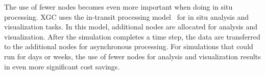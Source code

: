 The use of fewer nodes becomes even more important when doing in situ processing. XGC uses the in-transit processing model~\cite{ChildsTerminology, Choi2018} for in situ analysis and visualization tasks. In this model, additional nodes are allocated for analysis and visualization. After the simulation completes a time step, the data are transferred to the additional nodes for asynchronous processing.
For simulations that could run for days or weeks, the use of fewer nodes for analysis and visualization results in even more significant cost savings.

